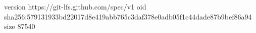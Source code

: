 version https://git-lfs.github.com/spec/v1
oid sha256:579131933bd22017d8e419abb765c3daf378e0adb05f1c44dade87b9bef86a94
size 87540
